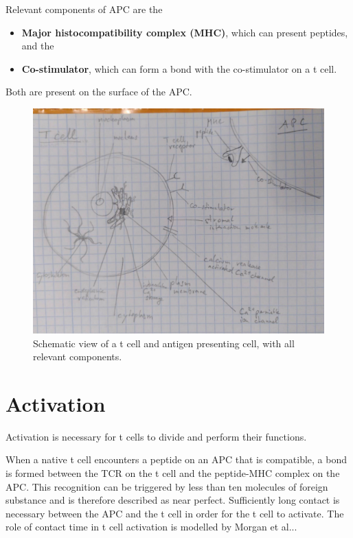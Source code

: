 Relevant components of APC are the
\begin{itemize}
	\item \textbf{Major histocompatibility complex (MHC)}, which can present peptides, and the
	\item \textbf{Co-stimulator}, which can form a bond with the co-stimulator on a t cell.
\end{itemize}

Both are present on the surface of the APC.

\begin{figure}
	\centering
	\includegraphics[width=\linewidth]{fig/tmp_t_cell_components}
	\caption{Schematic view of a t cell and antigen presenting cell, with all relevant components.}
	\label{fig:tcellcomponents}
\end{figure}

\section{Activation}
\label{sec:t-cell/activation}

Activation is necessary for t cells to divide and perform their functions.\cite{Ganong1997}

When a native t cell encounters a peptide on an APC that is compatible, a bond is formed between the TCR on the t cell and the peptide-MHC complex on the APC. This recognition can be triggered by less than ten molecules of foreign substance and is therefore described as near perfect. Sufficiently long contact is necessary between the APC and the t cell in order for the t cell to activate. The role of contact time in t cell activation is modelled by Morgan et al..\cite{morgan2023}.

